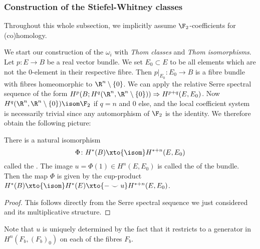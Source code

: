 \subsubsection{Construction of the Stiefel-Whitney classes}
Throughout this whole subsection, we implicitly assume $\F_2$-coefficients for (co)homology.

We start our construction of the $\omega_i$ with \emph{Thom classes} and \emph{Thom isomorphisms}.
Let $p\colon E \to B$ be a real vector bundle.
We set $E_0 \subset E$ to be all elements which are not the 0-element in their respective fibre.
Then $p|_{E_0}\colon E_0 \to B$ is a fibre bundle with fibres homeomorphic to $\R^n \setminus \{0\}$.
We can apply the relative Serre spectral sequence of the form $H^p(B; H^q(\R^n, \R^n \setminus \{0\})) \Rightarrow H^{p + q}(E, E_0)$.
Now $H^q(\R^n, \R^n \setminus \{0\}) \isom \F_2$ if $q = n$ and 0 else, and the local coefficient system is necessarily trivial since any automorphism of $\F_2$ is the identity.
We therefore obtain the following picture:
\begin{theorem}
	There is a natural isomorphism 
	\begin{equation*}
		\Phi\colon H^*(B) \xto{\isom} H^{* + n}(E, E_0)
	\end{equation*}
	called the .
	The image $u = \Phi(1) \in H^n(E, E_0)$ is called the  of the bundle.
	Then the map $\Phi$ is given by the cup-product $H^*(B) \xto{\isom} H^*(E) \xto{{{-}} \smile u} H^{* + n}(E, E_0)$.
\end{theorem}
\begin{proof}
	This follows directly from the Serre spectral sequence we just considered and its multiplicative structure.
\end{proof}
Note that $u$ is uniquely determined by the fact that it restricts to a generator in $H^n(F_b, (F_b)_0)$ on each of the fibres $F_b$.
